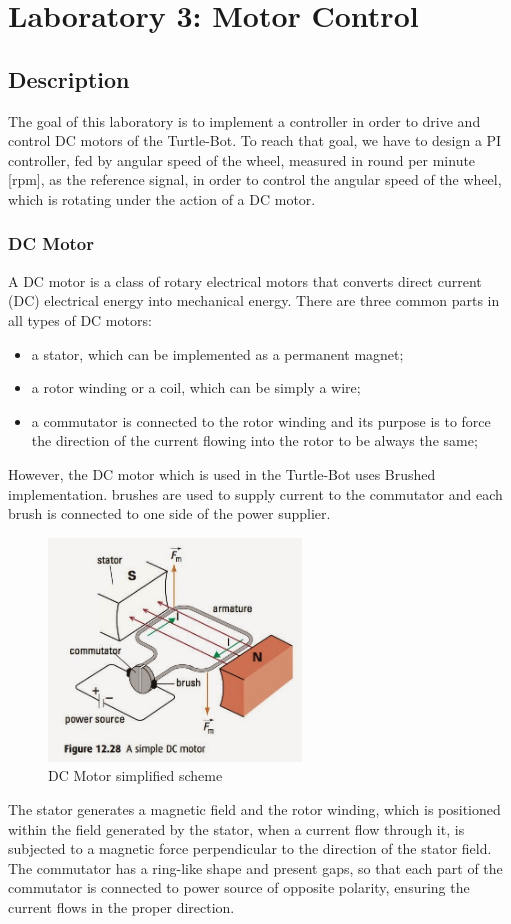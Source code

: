 \documentclass[english]{article}
\begin{document}
\clearpage

\section{Laboratory 3: Motor Control}
\subsection{Description}
The goal of this laboratory is to implement a controller in order to drive and 
control DC motors of the Turtle-Bot. To reach that goal, we have to design a PI 
controller, fed by angular speed of the wheel, measured in round per minute [rpm],
as the reference signal, in order to control the angular speed of the wheel, which
is rotating under the action of a DC motor.  
\subsubsection{DC Motor}
A DC motor is a class of rotary electrical motors that converts direct current (DC)
electrical energy into mechanical energy. There are three common parts in all types
of DC motors: 
\begin{itemize}
    \item a stator, which can be implemented as a permanent magnet; 
    \item a rotor winding or a coil, which can be simply a wire; 
    \item a commutator is connected to the rotor winding and its purpose is to force 
    the direction of the current flowing into the rotor to be always the same; 
\end{itemize}
However, the DC motor which is used in the Turtle-Bot uses Brushed implementation.
brushes are used to supply current to the commutator and each brush is connected to
one side of the power supplier. 
\newpage
\begin{figure}[!h]
    \centering
    \includegraphics[width=0.60\textwidth, height=0.30\textheight]{figures/motorfig.png}
    \caption{DC Motor simplified scheme }
    \label{fig:motorfig}
\end{figure}
The stator generates a magnetic field and the rotor winding, which is positioned within
 the field generated by the stator, when a current flow through it, is subjected to a 
 magnetic force perpendicular to the direction of the stator field. The commutator has
  a ring-like shape and present gaps, so that each part of the commutator is connected
to power source of opposite polarity, ensuring the current flows in the proper
   direction. 
\end{document}
